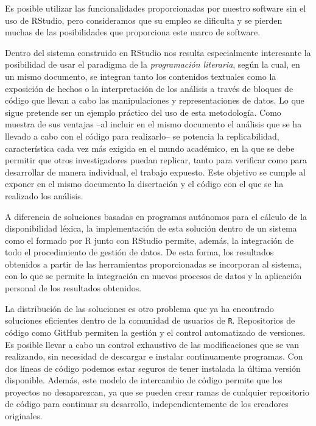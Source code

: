 \documentclass[
]{article}
\begin{document}
Es posible utilizar las funcionalidades proporcionadas por nuestro
software sin el uso de RStudio, pero consideramos que su empleo se
dificulta y se pierden muchas de las posibilidades que proporciona este
marco de software.

Dentro del sistema construido en RStudio nos resulta especialmente
interesante la posibilidad de usar el paradigma de la \emph{programación
literaria}, según la cual, en un mismo documento, se integran tanto los
contenidos textuales como la exposición de hechos o la interpretación de
los análisis a través de bloques de código que llevan a cabo las
manipulaciones y representaciones de datos. Lo que sigue pretende ser un
ejemplo práctico del uso de esta metodología. Como muestra de sus
ventajas --al incluir en el mismo documento el análisis que se ha
llevado a cabo con el código para realizarlo-- se potencia la
replicabilidad, característica cada vez más exigida en el mundo
académico, en la que se debe permitir que otros investigadores puedan
replicar, tanto para verificar como para desarrollar de manera
individual, el trabajo expuesto. Este objetivo se cumple al exponer en
el mismo documento la disertación y el código con el que se ha realizado
los análisis.

A diferencia de soluciones basadas en programas autónomos para el
cálculo de la disponibilidad léxica, la implementación de esta solución
dentro de un sistema como el formado por R junto con RStudio permite,
además, la integración de todo el procedimiento de gestión de datos. De
esta forma, los resultados obtenidos a partir de las herramientas
proporcionadas se incorporan al sistema, con lo que se permite la
integración en nuevos procesos de datos y la aplicación personal de los
resultados obtenidos.

La distribución de las soluciones es otro problema que ya ha encontrado
soluciones eficientes dentro de la comunidad de usuarios de \texttt{R}.
Repositorios de código como GitHub permiten la gestión y el control
automatizado de versiones. Es posible llevar a cabo un control
exhaustivo de las modificaciones que se van realizando, sin necesidad de
descargar e instalar continuamente programas. Con dos líneas de código
podemos estar seguros de tener instalada la última versión disponible.
Además, este modelo de intercambio de código permite que los proyectos
no desaparezcan, ya que se pueden crear ramas de cualquier repositorio
de código para continuar su desarrollo, independientemente de los
creadores originales.
\end{document}
